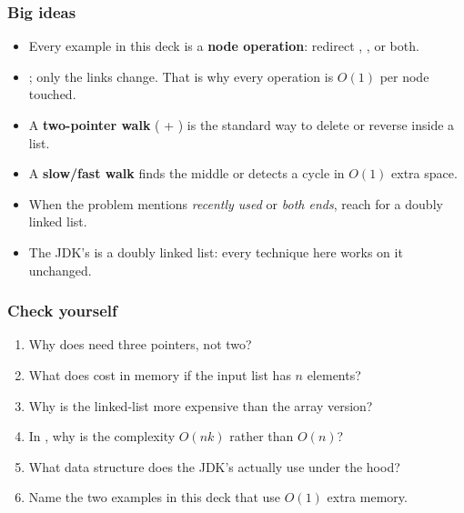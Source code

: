 \documentclass[aspectratio=169,10pt,compress]{beamer}
\begin{document}




\begin{frame}[t,fragile] \frametitle{Big ideas}
  \begin{itemize}
    \item Every example in this deck is a \textbf{node operation}:
          redirect , , or both.
    \item {}; only the links change.
          That is why every operation is $O(1)$ per node touched.
    \item A \textbf{two-pointer walk} ( + )
          is the standard way to delete or reverse inside a list.
    \item A \textbf{slow/fast walk} finds the middle or detects a cycle
          in $O(1)$ extra space.
    \item When the problem mentions \emph{recently used} or
          \emph{both ends}, reach for a doubly linked list.
    \item The JDK's  is a doubly linked list:
          every technique here works on it unchanged.
  \end{itemize}
\end{frame}




\begin{frame}[t,fragile] \frametitle{Check yourself}
  \begin{enumerate}\small
    \item Why does  need three pointers, not two?
    \item What does  cost in memory if the input list
          has $n$ elements?
    \item Why is the linked-list  more expensive than
          the array version?
    \item In , why is the complexity $O(nk)$ rather than $O(n)$?
    \item What data structure does the JDK's 
          actually use under the hood?
    \item Name the two examples in this deck that use $O(1)$ extra memory.
  \end{enumerate}
\end{frame}
\end{document}
